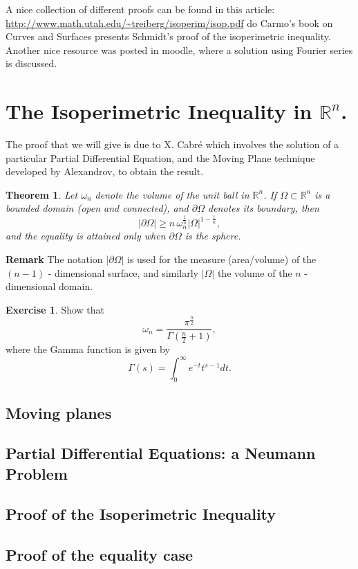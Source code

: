 \documentclass{amsart}
\newtheorem{thm}{Theorem}
\begin{document}
A nice collection of different proofs can be found in this article: \url{http://www.math.utah.edu/\~treiberg/isoperim/isop.pdf}
do Carmo's book on Curves and Surfaces presents Schmidt's proof of the isoperimetric inequality.
Another nice resource was posted in moodle, where a solution using Fourier series is discussed.

\section{The Isoperimetric Inequality in \(\mathbb{R}^n\).}
\label{sec:orgbf12cbf}

The proof that we will give is due to X. Cabré which involves the solution of a particular Partial Differential Equation, and the Moving Plane technique developed by Alexandrov, to obtain the result.


\begin{thm}
Let \(\omega_n\) denote the volume of the unit ball in \(\mathbb{R}^n\). If \(\Omega \subset\mathbb{R}^n\) is a bounded domain (open and connected), and \(\partial \Omega\) denotes its boundary, then
\[ |\partial\Omega| \geq n \, \omega_n^{\frac{1}{n}} |\Omega|^{1-\frac{1}{n}}, \]
and the equality is attained only when \(\partial \Omega\) is the sphere.
\end{thm}

\textbf{Remark} The notation \(|\partial \Omega|\) is used for the measure (area/volume) of the \((n-1)\) - dimensional surface, and similarly \(|\Omega|\) the volume of the \(n\) - dimensional domain.

\textbf{Exercise 1}. Show that 
\[ \omega_n = \frac{\pi^{\frac{n}{2}}}{\Gamma(\frac{n}{2} + 1)}, \]
where the Gamma function is given by
\[ \Gamma(s) = \int_{0}^{\infty} e^{-t}t^{s-1}dt. \]

\subsection{Moving planes}
\label{sec:orga76070a}

\subsection{Partial Differential Equations: a Neumann Problem}
\label{sec:orga46bd90}

\subsection{Proof of the Isoperimetric Inequality}
\label{sec:org3c7aa95}

\subsection{Proof of the equality case}
\label{sec:orga6f95d6}
\end{document}
